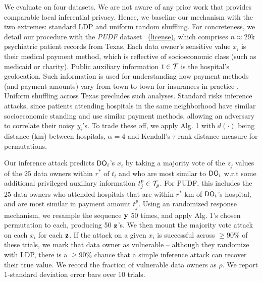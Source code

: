 We evaluate on four datasets.  We are not aware of any prior work that provides comparable local inferential privacy. Hence, we baseline our mechanism with the two extremes: standard \textsf{LDP} and uniform random shuffling.  For concreteness, we detail our procedure with the \textit{PUDF} dataset~\citep{PUDF} \href{https://www.dshs.state.tx.us/THCIC/Hospitals/Download.shtm}{(license)}, which comprises $n \approx 29$k psychiatric patient records from Texas. Each data owner's sensitive value $x_i$ is their medical payment method, which is reflective of socioeconomic class (such as medicaid or charity). Public auxiliary information $t \in \mathcal{T}$ is the hospital's geolocation. Such information is used for understanding how payment methods (and payment amounts) vary from town to town for insurances in practice \citep{insurance}. Uniform shuffling across Texas precludes such analyses. Standard \ldp risks inference attacks, since patients attending hospitals in the same neighborhood have similar socioeconomic standing and use similar payment methods, allowing an adversary to correlate their noisy $y_i$'s. To trade these off, we apply Alg. 1 with $d(\cdot)$ being distance (km) between hospitals, $\alpha = 4$ and Kendall's $\tau$ rank distance measure for permutations. %

Our inference attack predicts $\textsf{DO}_i$'s $x_i$ by taking a majority vote of the $z_j$ values of the $25$ data owners within $r^*$ of $t_i$ and who are most similar to $\textsf{DO}_i$ w.r.t some additional privileged auxiliary information $t^p_j \in \mathcal{T}_p$. For PUDF, this includes the $25$ data owners who attended hospitals that are within $r^*$ km of $\textsf{DO}_i$'s hospital, and are most similar in payment amount $t^p_j$. Using an \scalebox{1}{$\epsilon = 2.5$} randomized response mechanism, we resample the \ldp sequence $\mathbf{y}$ 50 times, and apply Alg. 1's chosen permutation to each, producing 50 $\mathbf{z}$'s. We then mount the majority vote attack on each $x_i$ for each $\mathbf{z}$. If the attack on a given $x_i$ is successful across $\geq 90\%$ of these \ldp trials, we mark that data owner as vulnerable -- although they randomize with \textsf{LDP}, there is a $\geq 90\%$ chance that a simple inference attack can recover their true value. We record the fraction of vulnerable data owners as $\rho$. %
We report 1-standard deviation error bars over 10 trials.   


